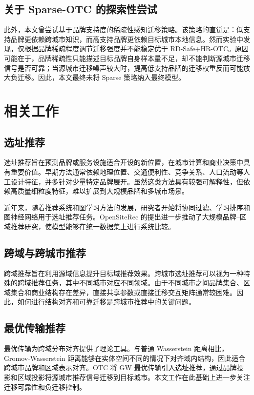 \documentclass[10pt,twocolumn]{ctexart}
\begin{document}
\subsection{关于 Sparse-OTC 的探索性尝试}

此外，本文曾尝试基于品牌支持度的稀疏性感知迁移策略。该策略的直觉是：低支持品牌更依赖跨城市知识，而高支持品牌更依赖目标城市本地信息。然而实验中发现，仅根据品牌稀疏程度调节迁移强度并不能稳定优于 RD-Safe+HR-OTC。原因可能在于，品牌稀疏性只能描述目标品牌自身样本量不足，却不能判断源城市迁移信号是否可靠；当源城市迁移噪声较大时，提高低支持品牌的迁移权重反而可能放大负迁移。因此，本文最终未将 Sparse 策略纳入最终模型。

\FloatBarrier
\section{相关工作}

\subsection{选址推荐}

选址推荐旨在预测品牌或服务设施适合开设的新位置，在城市计算和商业决策中具有重要价值。早期方法通常依赖地理位置、交通便利性、竞争关系、人口流动等人工设计特征，并多针对少量特定品牌展开。虽然这类方法具有较强可解释性，但依赖高质量细粒度特征，难以扩展到大规模品牌和多城市场景。

近年来，随着推荐系统和图学习方法的发展，研究者开始将协同过滤、学习排序和图神经网络用于选址推荐任务。OpenSiteRec 的提出进一步推动了大规模品牌--区域推荐研究，使模型能够在统一数据集上进行系统比较。

\subsection{跨域与跨城市推荐}

跨域推荐旨在利用源域信息提升目标域推荐效果。跨城市选址推荐可以视为一种特殊的跨域推荐任务，其中不同城市对应不同领域。由于不同城市之间品牌集合、区域集合和商业结构存在差异，直接共享参数或直接迁移交互矩阵通常较困难。因此，如何进行结构对齐和可靠迁移是跨城市推荐中的关键问题。

\subsection{最优传输推荐}

最优传输为跨域分布对齐提供了理论工具。与普通 Wasserstein 距离相比，Gromov-Wasserstein 距离能够在实体空间不同的情况下对齐域内结构，因此适合跨城市品牌和区域表示对齐。OTC 将 GW 最优传输引入选址推荐，通过品牌投影和区域投影将源城市推荐信号迁移到目标城市。本文工作在此基础上进一步关注迁移可靠性和负迁移控制。
\end{document}
